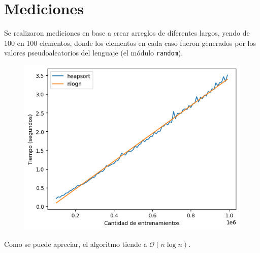 \section{Mediciones}

Se realizaron mediciones en base a crear arreglos de diferentes largos, yendo de 100 en 100 elementos, donde los elementos en cada caso fueron generados por los valores pseudoaleatorios del lenguaje (el m\'odulo \texttt{random}). 

\begin{figure}[H]
    \centering %
    \includegraphics[width=1\textwidth]{img/tiempos.png}
\end{figure}

Como se puede apreciar, el algoritmo tiende a $\mathcal{O}\left(n \log n\right)$.
